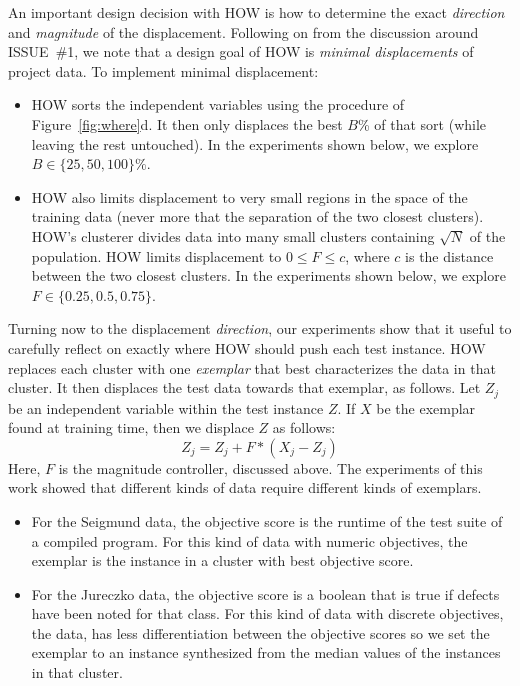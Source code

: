 \documentclass[conference]{IEEEtran}
\newcommand{\bi}{\begin{itemize}}
\newcommand{\ei}{\end{itemize}}
\newcommand{\fig}[1]{Figure~\ref{fig:#1}}
\begin{document}
An important design decision with HOW 
is how to determine the exact {\em direction} and {\em magnitude} of the
displacement.  Following on from the discussion around   ISSUE~\#1,
we note that a design goal of HOW is
{\em minimal displacements} of project data.
To implement minimal displacement:
\bi
\item
HOW sorts  the independent variables
using the procedure of  \fig{where}d. It then only
displaces the    best $B$\%  of that sort (while leaving the rest untouched).
In  the experiments shown below,  we explore   $B \in \{25,50,100\}\%$.
\item
HOW also  limits displacement
to very small regions in the space of the training data (never more that the separation
of the two closest clusters).  HOW's clusterer divides  data into many   small clusters containing
$\sqrt{N}$ of the population.
HOW   limits displacement to  \mbox{$0 \le F \le c$}, where
$c$ is the distance between the two closest clusters. 
In  the experiments shown below,  we explore
\mbox{$F\in \{0.25, 0.5, 0.75\}$}.
\ei
Turning now to the displacement {\em direction},
our experiments show that it useful to  carefully reflect on exactly where HOW should  push each test instance.
HOW replaces each cluster   with one {\em exemplar} that best
characterizes the data in that cluster. It then displaces the
test data towards that exemplar, as follows.
Let $Z_j$ be an independent variable within the
test instance $Z$. If  $X$ be the exemplar found at training time,
then we displace $Z$ as follows:
\[Z_j =  Z_j + F*(X_j - Z_j)\]
Here, $F$ is the  magnitude controller, discussed above.
The experiments of this work showed that different kinds of data require
different kinds of exemplars.
\bi
\item
For the Seigmund data,
the objective score is the runtime of the test suite of a compiled program.
For this kind of data with numeric objectives,
the exemplar  is the instance in a cluster
with  best objective score.
\item
For the Jureczko data, the objective score
is a boolean that is true if defects have been noted
for that class. 
For this kind of data with discrete objectives,
the data, 
has less differentiation between the objective scores
so we set the exemplar to  
an instance synthesized from the median values of the instances
in that cluster.
\ei 

  
  
\end{document}
